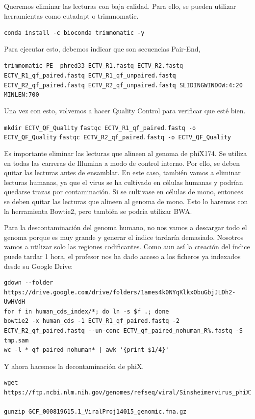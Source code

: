 Queremos eliminar las lecturas con baja calidad. Para ello, se pueden utilizar herramientas como cutadapt o trimmomatic. 

\texttt{conda install -c bioconda trimmomatic -y}

Para ejecutar esto, debemos indicar que son secuencias Pair-End, 

\texttt{trimmomatic PE -phred33 ECTV\_R1.fastq ECTV\_R2.fastq ECTV\_R1\_qf\_paired.fastq ECTV\_R1\_qf\_unpaired.fastq ECTV\_R2\_qf\_paired.fastq ECTV\_R2\_qf\_unpaired.fastq SLIDINGWINDOW:4:20 MINLEN:700}

Una vez con esto, volvemos a hacer Quality Control para verificar que esté bien.

\texttt{mkdir ECTV\_QF\_Quality}
\texttt{fastqc ECTV\_R1\_qf\_paired.fastq -o ECTV\_QF\_Quality}
\texttt{fastqc ECTV\_R2\_qf\_paired.fastq -o ECTV\_QF\_Quality}

Es importante eliminar las lecturas que alineen al genoma de phiX174. Se utiliza en todas las carreras de Illumina a modo de control interno. Por ello, se deben quitar las lecturas antes de ensamblar. En este caso, también vamos a eliminar lecturas humanas, ya que el virus se ha cultivado en células humanas y podrían quedarse trazas por contaminación. Si se cultivase en células de mono, entonces se deben quitar las lecturas que alineen al genoma de mono. Esto lo haremos con la herramienta Bowtie2, pero también se podría utilizar BWA. 

Para la descontaminación del genoma humano, no nos vamos a descargar todo el genoma porque es muy grande y generar el índice tardaría demasiado. Nosotros vamos a utilizar solo las regiones codificantes. Como aun así la creación del índice puede tardar 1 hora, el profesor nos ha dado acceso a los ficheros ya indexados desde su Google Drive:

\begin{lstlisting}
gdown --folder https://drive.google.com/drive/folders/1ames4k0NYqKlkxObuGbjJLDh2-UwHVdH
for f in human_cds_index/*; do ln -s $f .; done
bowtie2 -x human_cds -1 ECTV_R1_qf_paired.fastq -2 ECTV_R2_qf_paired.fastq --un-conc ECTV_qf_paired_nohuman_R%.fastq -S tmp.sam
wc -l *_qf_paired_nohuman* | awk '{print $1/4}'
\end{lstlisting}

Y ahora hacemos la decontaminación de phiX.
\begin{lstlisting}
wget https://ftp.ncbi.nlm.nih.gov/genomes/refseq/viral/Sinsheimervirus_phiX174/latest_assembly_versions/GCF_000819615.1_ViralProj14015/GCF_000819615.1_ViralProj14015_genomic.fna.gz

gunzip GCF_000819615.1_ViralProj14015_genomic.fna.gz
\end{lstlisting}

